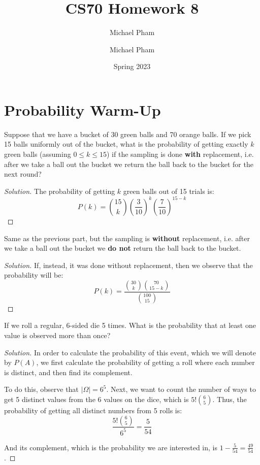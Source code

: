 \documentclass{article}
\title{#1}
\author{Michael Pham}
\date{#2}
\newenvironment{solution}{\begin{proof}[Solution]}{\end{proof}}
\newcommand{\mytitle}[2]{%
	\title{#1}
	\author{Michael Pham}
	\date{#2}
	\maketitle
	\newpage
	\tableofcontents
	\newpage
}
\begin{document}
\mytitle{CS70 Homework 8}{Spring 2023}

\section{Probability Warm-Up}
\begin{hw}
	Suppose that we have a bucket of 30 green balls and 70 orange balls. If we pick 15 balls uniformly out of the bucket, what is the probability of getting exactly $k$ green balls (assuming $0 \leq k \leq 15$) if the sampling is done \textbf{with} replacement, i.e. after we take a ball out the bucket we return the ball back to the bucket for the next round?
\end{hw}
\begin{solution}
	The probability of getting $k$ green balls out of 15 trials is:
	\begin{equation*}
		P(k) = \binom{15}{k}\left( \dfrac{3}{10} \right)^{k}\left( \dfrac{7}{10} \right)^{15-k}
	\end{equation*}
\end{solution}

\begin{hw}
	Same as the previous part, but the sampling is \textbf{without} replacement, i.e. after we take a ball out the bucket we \textbf{do not} return the ball back to the bucket.
\end{hw}
\begin{solution}
	If, instead, it was done without replacement, then we observe that the probability will be:
	\begin{equation*}
		P(k) = \dfrac{\binom{30}{k}\binom{70}{15-k}}{\binom{100}{15}}
	\end{equation*}
\end{solution}

\begin{hw}
	If we roll a regular, 6-sided die 5 times. What is the probability that at least one value is observed more than once?
\end{hw}
\begin{solution}
	In order to calculate the probability of this event, which we will denote by $P(A)$, we first calculate the probability of getting a roll where each number is distinct, and then find its complement.
	
	To do this, observe that $\lvert \Omega \rvert = 6^{5}$. Next, we want to count the number of ways to get 5 distinct values from the 6 values on the dice, which is $5!\binom{6}{5}$. Thus, the probability of getting all distinct numbers from 5 rolls is:
	\begin{equation*}
		\dfrac{5!\binom{6}{5}}{6^{5}} = \dfrac{5}{54}
	\end{equation*}

	And its complement, which is the probability we are interested in, is $1 - \frac{5}{54} = \frac{49}{54}$.
\end{solution}
\end{document}
